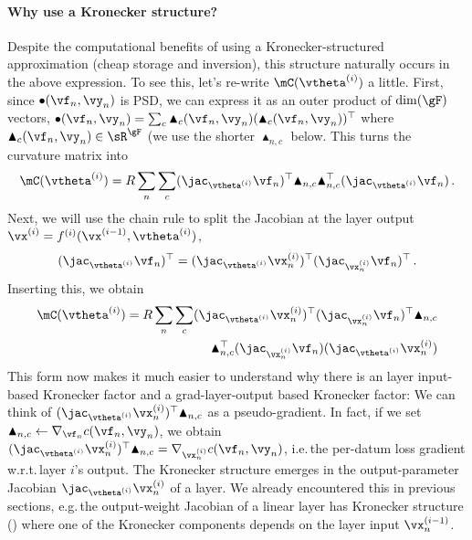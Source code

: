 \paragraph{Why use a Kronecker structure?}
Despite the computational benefits of using a Kronecker-structured approximation (cheap storage and inversion), this structure naturally occurs in the above expression.
To see this, let's re-write $\mC(\vtheta^{(i)})$ a little.
First, since $\bullet(\vf_n, \vy_n)$ is PSD, we can express it as an outer product of $\dim(\gF)$ vectors,
$\bullet(\vf_n, \vy_n) = \sum_{c} \blacktriangle_c(\vf_n, \vy_n) (\blacktriangle_c(\vf_n, \vy_n))^{\top}$ where $\blacktriangle_c(\vf_n, \vy_n) \in \sR^{\gF}$ (we use the shorter $\blacktriangle_{n,c}$ below. This turns the curvature matrix into
\begin{align*}
  \mC(\vtheta^{(i)})
  =
  R \sum_n \sum_{c}
  (\jac_{\vtheta^{(i)}} \vf_n)^{\top}
  \blacktriangle_{n,c} \blacktriangle_{n,c}^{\top}
  (\jac_{\vtheta^{(i)}} \vf_n)\,.
\end{align*}
Next, we will use the chain rule to split the Jacobian at the layer output $\vx^{(i)} = f^{(i)}(\vx^{(i-1)}, \vtheta^{(i)})$,
\begin{align*}
  (\jac_{\vtheta^{(i)}} \vf_n)^{\top}
  =
  (\jac_{\vtheta^{(i)}} \vx^{(i)}_n)^{\top}
  (\jac_{\vx_n^{(i)}} \vf_n)^{\top}\,.
\end{align*}
Inserting this, we obtain
\begin{align*}
  \mC(\vtheta^{(i)})
  =
  R \sum_n \sum_{c}
  (\jac_{\vtheta^{(i)}} \vx^{(i)}_n)^{\top}
  (\jac_{\vx_n^{(i)}} \vf_n)^{\top}
  \blacktriangle_{n,c}
  \\
  \blacktriangle_{n,c}^{\top}
  (\jac_{\vx_n^{(i)}} \vf_n)
  (\jac_{\vtheta^{(i)}} \vx^{(i)}_n)
\end{align*}
This form now makes it much easier to understand why there is an layer input-based Kronecker factor and a grad-layer-output based Kronecker factor: We can think of $(\jac_{\vtheta^{(i)}} \vx_n^{(i)})^{\top} \blacktriangle_{n,c}$ as a pseudo-gradient.
In fact, if we set $\blacktriangle_{n,c} \leftarrow \nabla_{\vf_n} c(\vf_n, \vy_n)$, we obtain $(\jac_{\vtheta^{(i)}} \vx_n^{(i)})^{\top} \blacktriangle_{n,c} = \nabla_{\vx_n^{(i)}} c(\vf_n, \vy_n)$, i.e.\,the per-datum loss gradient w.r.t.\,layer $i$'s output.
The Kronecker structure emerges in the output-parameter Jacobian $\jac_{\vtheta^{(i)}} \vx_n^{(i)}$ of a layer.
We already encountered this in previous sections, e.g.\,the output-weight Jacobian of a linear layer has Kronecker structure () where one of the Kronecker components depends on the layer input $\vx^{(i-1)}_n$.

